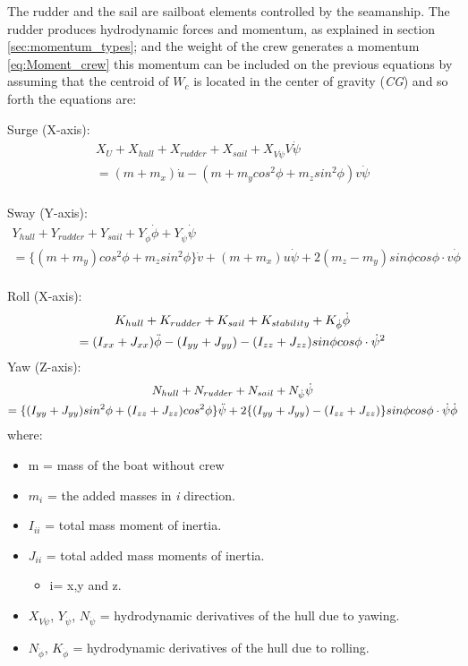 The rudder and the sail are sailboat elements controlled by the seamanship. 
The rudder produces hydrodynamic forces and momentum, as explained in section \ref{sec:momentum_types}; and the weight of the crew generates a momentum \ref{eq:Moment_crew} 
this momentum can be included on the previous equations by assuming that the centroid of $W_{c}$ is located in the center of gravity (\textit{CG}) and so forth the equations are:\par \noindent
Surge (X-axis):
\begin{multline}\label{eq:force_xMasuyama}
    X_{U}+X_{hull}+X_{rudder}+X_{sail}+X_{V\Dot{\psi}}V\Dot{\psi}\\ =(m+m_{x})\Dot{u}-(m+m_{y}cos^2\phi+m_{z}sin^2\phi)v\Dot{\psi}
\end{multline}
\\
Sway  (Y-axis):
\begin{multline}
\label{eq:force_yMasuyama}
Y_{hull} + Y_{rudder} + Y_{sail} + Y_{\Dot{\phi}} \Dot{\phi} + Y_{\Dot{\psi}} \Dot{\psi} \\ 
=\{(m + m_{y})cos^2 \phi + m_{z} sin^2 \phi \} \Dot{v} + (m + m_{x})u \Dot{\psi} + 2(m_{z} - m_{y}) sin\phi cos\phi \cdot v \Dot{\phi}
\end{multline}
\\
Roll (X-axis):
\begin{multline}
     K_{hull} + K_{rudder} + K_{sail} + K_{stability} +K_{\Dot{\phi}} \Dot{\phi} \\
 =(I_{xx} + J_{xx}) \Ddot{\phi} - {(I_{yy} + J_{yy})-(I_{zz} + J_{zz})} sin\phi cos\phi \cdot \Dot{\psi}^2
\end{multline}  \label{eq:m_xMasuyama}
\newline
Yaw (Z-axis):
\begin{multline}
   N_{hull}+N_{rudder}+N_{sail}+N_{\Dot{\psi}}\Dot{\psi}\\
 = \{ (I_{yy} + J_{yy}) sin^2 \phi +(I_{zz} + J_{zz})cos^2 \phi \} \Ddot{\psi} +2 \{(I_{yy} + J_{yy})-(I_{zz} + J_{zz})\}sin\phi cos\phi \cdot \Dot{\psi} \Dot{\phi}  
\end{multline}\label{eq:m_yMasuyama}
\newline
where: 
\begin{itemize}  \label{symbols_motions2}
 \setlength \itemsep{0em}
\item m = mass of the boat without crew
\item $m_{i}$ = the added masses in \textit{i} direction.
\item $I_{ii}$ = total mass moment of inertia.
\item $J_{ii}$ = total added mass moments of inertia.
\begin{itemize}
    \item i= x,y and z.
\end{itemize} 
\item $X_{V\Dot{\psi}}$, $Y_{\Dot{\psi}}$, $N_{\Dot{\psi}}$  = hydrodynamic derivatives of the hull due to yawing.
\item $N_{\Dot{\phi}}$, $K_{\Dot{\phi}}$  = hydrodynamic derivatives of the hull due to rolling.
\end{itemize}

